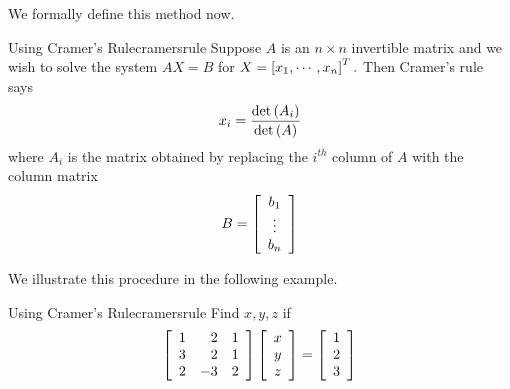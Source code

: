 We formally define this method now. 

\begin{procedure}{Using Cramer's Rule}{cramersrule}
Suppose $A$ is an $n\times n$ invertible matrix and we wish to solve the system 
$AX=B$ for $X
=\left[ x_{1},\cdots ,x_{n}\right] ^{T}.$ Then Cramer's rule says
\begin{equation*}
x_{i}=
\vspace{0.05in}\frac{\det \left(A_{i}\right)}{\det \left(A\right)}
\end{equation*}
where $A_{i}$ is the matrix obtained by replacing the $i^{th}$ column of $A$
with the column matrix
\begin{equation*}
B = 
\left[
\begin{array}{c}
b_1 \\
\vdots \\
b_n
\end{array}
\right]
\end{equation*} 
\end{procedure}

We illustrate this procedure in the following example.

\begin{example}{Using Cramer's Rule}{cramersrule}
Find $x,y,z$ if
\begin{equation*}
\left[
\begin{array}{rrr}
1 & 2 & 1 \\
3 & 2 & 1 \\
2 & -3 & 2
\end{array}
\right] \left[
\begin{array}{c}
x \\
y \\
z
\end{array}
\right] =\left[
\begin{array}{r}
1 \\
2 \\
3
\end{array}
\right] 
\end{equation*}
\end{example}


